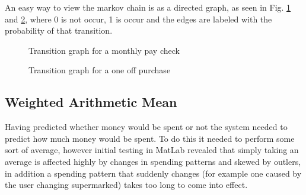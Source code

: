 
An easy way to view the markov chain is as a directed graph, as seen in Fig. \ref{fig:transition-monthly} and \ref{fig:transition-one}, where 0 is not occur, 1 is occur and the edges are labeled with the probability of that transition.


\begin{figure}[h]
\centering
{}
\caption{Transition graph for a monthly pay check}
\label{fig:transition-monthly}
\end{figure}

\begin{figure}[h]
\centering
{}
\caption{Transition graph for a one off purchase}
\label{fig:transition-one}
\end{figure}

\subsection{Weighted Arithmetic Mean}
Having predicted whether money would be spent or not the system needed to predict how much money would be spent. To do this it needed to perform some sort of average, however initial testing in MatLab revealed that simply taking an average is affected highly by changes in spending patterns and skewed by outlers, in addition a spending pattern that suddenly changes (for example one caused by the user changing supermarked) takes too long to come into effect.


